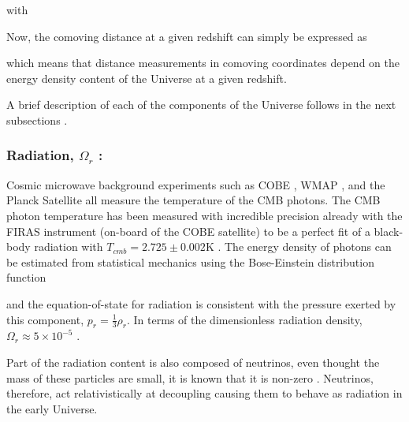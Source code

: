 with


\qquad Now, the comoving distance at a given redshift can simply be expressed as

which means that distance measurements in comoving coordinates depend on the energy density content of the Universe at a given redshift. 

\qquad A brief description of each of the components of the Universe follows in the next subsections \citep{dods,schneider_2016}.

\subsubsection{Radiation, $\Omega_r$ :}
 Cosmic microwave background experiments such as COBE \citep{COBE}, WMAP \citep{WMAP_MapsResults,WMAP_Cosmology}, and the Planck Satellite \citep{2018PlanckCosmology} all measure the temperature of the CMB photons. The CMB photon temperature has been measured with incredible precision already with the FIRAS instrument (on-board of the COBE satellite) to be a perfect fit of a black-body radiation with $T_{cmb} = 2.725\pm 0.002$K \citep{1999FIRAS}. The energy density of photons can be estimated from statistical mechanics using the Bose-Einstein distribution function \citep[][p. 40]{dods}
 
and the equation-of-state for radiation is consistent with the pressure exerted by this component, $p_r = \frac{1}{3}\rho_r$. In terms of the dimensionless radiation density, $\Omega_r \approx 5 \times 10^{-5}$ \citep[][p. 182]{schneider_2016}.

\qquad Part of the radiation content is also composed of neutrinos, even thought the mass of these particles are small, it is known that it is non-zero \citep{Kamiokande1998}. Neutrinos, therefore, act relativistically at decoupling causing them to behave as radiation in the early Universe.

